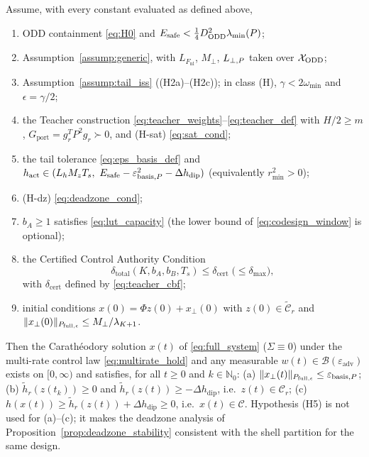 \begin{theorem}
\label{thm:main_cbf}
Assume, with every constant evaluated as defined above,
\begin{enumerate}
\item[(H0)] ODD containment \eqref{eq:H0} and \(E_{\mathrm{safe}} < \frac14D_{\mathrm{ODD}}^2\lambda_{\min}(P)\);
\item[(H1)] Assumption~\ref{assump:generic}, with \(L_{F_{\mathrm{nl}}}\), \(M_\perp\), \(L_{\perp,P}\) taken over \(\mathcal{X}_{\mathrm{ODD}}\);
\item[(H2)] Assumption~\ref{assump:tail_iss} ((H2a)--(H2c)); in class (H), \(\gamma < 2\omega_{\min}\) and \(\epsilon = \gamma/2\);
\item[(H3)] the Teacher construction \eqref{eq:teacher_weights}--\eqref{eq:teacher_def} with \(H/2 \ge m\), \(G_{\mathrm{port}} = g_r^TP^2g_r \succ 0\), and (H-sat) \eqref{eq:sat_cond};
\item[(H4)] the tail tolerance \eqref{eq:eps_basis_def} and \(h_{\mathrm{act}} \in (L_hM_zT_s,\ E_{\mathrm{safe}} - \varepsilon_{\mathrm{basis},P}^2 - \Delta h_{\mathrm{dip}})\) (equivalently \(r_{\min}^2 > 0\));
\item[(H5)] (H-dz) \eqref{eq:deadzone_cond};
\item[(H6)] \(b_A \ge 1\) satisfies \eqref{eq:lut_capacity} (the lower bound of \eqref{eq:codesign_window} is optional);
\item[(H7)] the Certified Control Authority Condition
\begin{equation}
\label{eq:control_authority}
\delta_{\mathrm{total}}(K, b_A, b_B, T_s) \le \delta_{\mathrm{cert}} \;\big(\le \delta_{\max}\big),
\end{equation}
with \(\delta_{\mathrm{cert}}\) defined by \eqref{eq:teacher_cbf};
\item[(H8)] initial conditions \(x(0) = \Phi z(0) + x_\perp(0)\) with \(z(0) \in \tilde{\mathcal{C}}_r\) and \(\|x_\perp(0)\|_{P_{\mathrm{full},\epsilon}} \le M_\perp/\lambda_{K+1}\).
\end{enumerate}
Then the Carath\'eodory solution \(x(t)\) of \eqref{eq:full_system} (\(\Sigma \equiv 0\)) under the multi-rate control law \eqref{eq:multirate_hold} and any measurable \(w(t) \in \mathcal{B}(\varepsilon_{\mathrm{adv}})\) exists on \([0,\infty)\) and satisfies, for all \(t \ge 0\) and \(k \in \mathbb{N}_0\): (a) \(\|x_\perp(t)\|_{P_{\mathrm{full},\epsilon}} \le \varepsilon_{\mathrm{basis},P}\); (b) \(\tilde{h}_r(z(t_k)) \ge 0\) and \(\tilde h_r(z(t)) \ge -\Delta h_{\mathrm{dip}}\), i.e.\ \(z(t) \in \mathcal{C}_r\); (c) \(h(x(t)) \ge \tilde h_r(z(t)) + \Delta h_{\mathrm{dip}} \ge 0\), i.e.\ \(x(t) \in \mathcal{C}\). Hypothesis (H5) is not used for (a)--(c); it makes the deadzone analysis of Proposition~\ref{prop:deadzone_stability} consistent with the shell partition for the same design.
\end{theorem}

